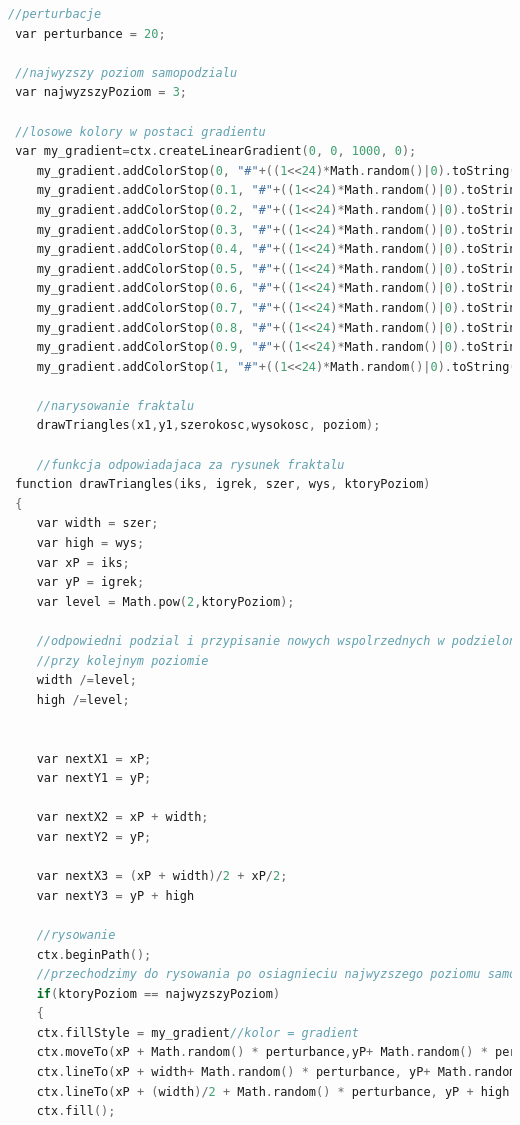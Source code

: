 \documentclass[polish,polish,a4paper]{article}
\begin{document}
{\small
\begin{lstlisting}[language=C++]
 //perturbacje
 var perturbance = 20;
 
 //najwyzszy poziom samopodzialu
 var najwyzszyPoziom = 3;
 
 //losowe kolory w postaci gradientu
 var my_gradient=ctx.createLinearGradient(0, 0, 1000, 0);
	my_gradient.addColorStop(0, "#"+((1<<24)*Math.random()|0).toString(16));
	my_gradient.addColorStop(0.1, "#"+((1<<24)*Math.random()|0).toString(16));
	my_gradient.addColorStop(0.2, "#"+((1<<24)*Math.random()|0).toString(16));
	my_gradient.addColorStop(0.3, "#"+((1<<24)*Math.random()|0).toString(16));
	my_gradient.addColorStop(0.4, "#"+((1<<24)*Math.random()|0).toString(16));
	my_gradient.addColorStop(0.5, "#"+((1<<24)*Math.random()|0).toString(16));
	my_gradient.addColorStop(0.6, "#"+((1<<24)*Math.random()|0).toString(16));
	my_gradient.addColorStop(0.7, "#"+((1<<24)*Math.random()|0).toString(16));
	my_gradient.addColorStop(0.8, "#"+((1<<24)*Math.random()|0).toString(16));
	my_gradient.addColorStop(0.9, "#"+((1<<24)*Math.random()|0).toString(16));
	my_gradient.addColorStop(1, "#"+((1<<24)*Math.random()|0).toString(16));
 
	//narysowanie fraktalu
	drawTriangles(x1,y1,szerokosc,wysokosc, poziom);
  
	//funkcja odpowiadajaca za rysunek fraktalu
 function drawTriangles(iks, igrek, szer, wys, ktoryPoziom)
 {
    var width = szer;
	var high = wys;
	var xP = iks;
	var yP = igrek;
	var level = Math.pow(2,ktoryPoziom);
	
	//odpowiedni podzial i przypisanie nowych wspolrzednych w podzielonym trojkacie
	//przy kolejnym poziomie
	width /=level; 
	high /=level;
	
	
	var nextX1 = xP;
	var nextY1 = yP;
	
	var nextX2 = xP + width;
	var nextY2 = yP;
	
	var nextX3 = (xP + width)/2 + xP/2;
	var nextY3 = yP + high
	 
	//rysowanie
	ctx.beginPath();
	//przechodzimy do rysowania po osiagnieciu najwyzszego poziomu samopodzialu
	if(ktoryPoziom == najwyzszyPoziom)
	{
	ctx.fillStyle = my_gradient//kolor = gradient
    ctx.moveTo(xP + Math.random() * perturbance,yP+ Math.random() * perturbance);								
    ctx.lineTo(xP + width+ Math.random() * perturbance, yP+ Math.random() * perturbance); 	    									
    ctx.lineTo(xP + (width)/2 + Math.random() * perturbance, yP + high + Math.random() * perturbance);
	ctx.fill();
	

\end{lstlisting}}
\end{document}
